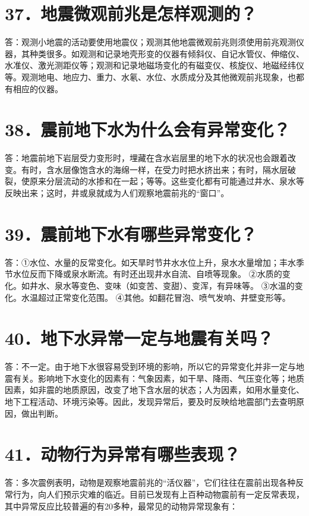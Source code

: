 \documentclass[a4paper,10pt,english]{sphinxmanual}
\begin{document}
\section{37．地震微观前兆是怎样观测的？}
\label{\detokenize{index:id43}}
答：观测小地震的活动要使用地震仪；观测其他地震微观前兆则须使用前兆观测仪器，其种类很多。如观测和记录地壳形变的仪器有倾斜仪、自记水管仪、伸缩仪、水准仪、激光测距仪等；观测和记录地磁场变化的有磁变仪、核旋仪、地磁经纬仪等。观测地电、地应力、重力、水氡、水位、水质成分及其他微观前兆现象，也都有相应的仪器。


\section{38．震前地下水为什么会有异常变化？}
\label{\detokenize{index:id44}}
答：地震前地下岩层受力变形时，埋藏在含水岩层里的地下水的状况也会跟着改变。有时，含水层像饱含水的海绵一样，在受力时把水挤出来；有时，隔水层破裂，使原来分层流动的水掺和在一起；等等。这些变化都有可能通过井水、泉水等反映出来；这时，井或泉就成为人们观察地震前兆的“窗口”。


\section{39．震前地下水有哪些异常变化？}
\label{\detokenize{index:id45}}
答：①水位、水量的反常变化。如天旱时节井水水位上升，泉水水量增加；丰水季节水位反而下降或泉水断流。有时还出现井水自流、自喷等现象。
②水质的变化。如井水、泉水等变色、变味（如变苦、变甜）、变浑，有异味等。
③水温的变化。水温超过正常变化范围。
④其他。如翻花冒泡、喷气发响、井壁变形等。


\section{40．地下水异常一定与地震有关吗？}
\label{\detokenize{index:id46}}
答：不一定。由于地下水很容易受到环境的影响，所以它的异常变化并非一定与地震有关。影响地下水变化的因素有：气象因素，如干旱、降雨、气压变化等；地质因素，如非震的地质原因，改变了地下含水层的状态；人为因素，如用水量变化、地下工程活动、环境污染等。因此，发现异常后，要及时反映给地震部门去查明原因，做出判断。


\section{41．动物行为异常有哪些表现？}
\label{\detokenize{index:id47}}
答：多次震例表明，动物是观察地震前兆的“活仪器”，它们往往在震前出现各种反常行为，向人们预示灾难的临近。目前已发现有上百种动物震前有一定反常表现，其中异常反应比较普遍的有20多种，最常见的动物异常现象有：
\begin{quote}

\end{quote}
\end{document}
